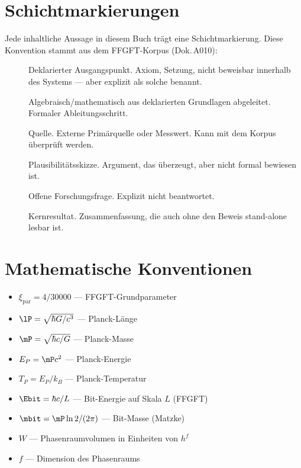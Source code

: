 
\section*{Schichtmarkierungen}

Jede inhaltliche Aussage in diesem Buch trägt eine Schichtmarkierung.
Diese Konvention stammt aus dem FFGFT-Korpus (Dok.\,A010):

\begin{description}
  \item[] Deklarierter Ausgangspunkt. Axiom, Setzung, nicht beweisbar
    innerhalb des Systems --- aber explizit als solche benannt.
  \item[] Algebraisch/mathematisch aus deklarierten Grundlagen abgeleitet.
    Formaler Ableitungsschritt.
  \item[\QQ{}] Quelle. Externe Primärquelle oder Messwert. Kann mit dem Korpus
    überprüft werden.
  \item[] Plausibilitätsskizze. Argument, das überzeugt, aber nicht
    formal bewiesen ist.
  \item[] Offene Forschungsfrage. Explizit nicht beantwortet.
  \item[] Kernresultat. Zusammenfassung, die auch ohne den Beweis
    stand-alone lesbar ist.
\end{description}

\section*{Mathematische Konventionen}

\begin{itemize}
  \item $\xi_{\text{par}} = 4/30000$ --- FFGFT-Grundparameter
  \item $\lP = \sqrt{\hbar G/c^3}$ --- Planck-Länge
  \item $\mP = \sqrt{\hbar c/G}$ --- Planck-Masse
  \item $E_P = \mP c^2$ --- Planck-Energie
  \item $T_P = E_P / k_B$ --- Planck-Temperatur
  \item $\Ebit = \hbar c / L$ --- Bit-Energie auf Skala $L$ (FFGFT)
  \item $\mbit = \mP \ln 2 / (2\pi)$ --- Bit-Masse (Matzke)
  \item $W$ --- Phasenraumvolumen in Einheiten von $h^f$
  \item $f$ --- Dimension des Phasenraums
\end{itemize}

